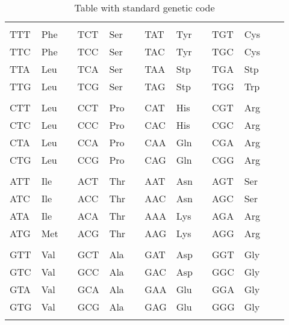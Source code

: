 \begin{table}
\begin{center}
{\normalsize
\begin{tabular}{*{13}{l}}
\hline
\\
TTT & Phe &  &
TCT & Ser &  &
TAT & Tyr &  &
TGT & Cys &  &
\\
TTC & Phe &  &
TCC & Ser &  &
TAC & Tyr &  &
TGC & Cys &  &
\\
TTA & Leu &  &
TCA & Ser &  &
TAA & Stp &  &
TGA & Stp &  &
\\
TTG & Leu &  &
TCG & Ser &  &
TAG & Stp &  &
TGG & Trp &  &
\\
\\
CTT & Leu &  &
CCT & Pro &  &
CAT & His &  &
CGT & Arg &  &
\\
CTC & Leu &  &
CCC & Pro &  &
CAC & His &  &
CGC & Arg &  &
\\
CTA & Leu &  &
CCA & Pro &  &
CAA & Gln &  &
CGA & Arg &  &
\\
CTG & Leu &  &
CCG & Pro &  &
CAG & Gln &  &
CGG & Arg &  &
\\
\\
ATT & Ile &  &
ACT & Thr &  &
AAT & Asn &  &
AGT & Ser &  &
\\
ATC & Ile &  &
ACC & Thr &  &
AAC & Asn &  &
AGC & Ser &  &
\\
ATA & Ile &  &
ACA & Thr &  &
AAA & Lys &  &
AGA & Arg &  &
\\
ATG & Met &  &
ACG & Thr &  &
AAG & Lys &  &
AGG & Arg &  &
\\
\\
GTT & Val &  &
GCT & Ala &  &
GAT & Asp &  &
GGT & Gly &  &
\\
GTC & Val &  &
GCC & Ala &  &
GAC & Asp &  &
GGC & Gly &  &
\\
GTA & Val &  &
GCA & Ala &  &
GAA & Glu &  &
GGA & Gly &  &
\\
GTG & Val &  &
GCG & Ala &  &
GAG & Glu &  &
GGG & Gly &  &
\\
\\
\hline
\end{tabular}
\caption[Genetic code table]{Table with standard genetic code}
\label{tab:sgencod}
}
\end{center}
\end{table}


